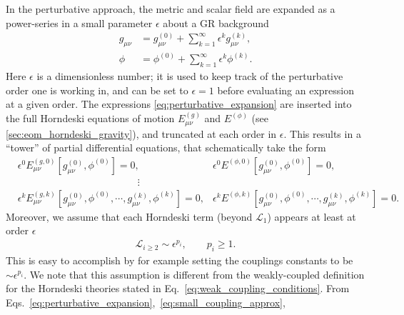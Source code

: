 \documentclass{ws-ijmpd}
\begin{document}
In the perturbative approach,
the metric and scalar field are expanded as a power-series
in a small parameter $\epsilon$ about a GR background
\begin{subequations}
   \label{eq:perturbative_expansion}
   \begin{align}
      g_{\mu\nu}
      &=
      g_{\mu\nu}^{(0)}
      +
      \sum_{k=1}^{\infty}\epsilon^k g^{(k)}_{\mu\nu}
      ,\\
      \phi
      &=
      \phi^{(0)}
      +
      \sum_{k=1}^{\infty}\epsilon^k\phi^{(k)}
      .
   \end{align}
\end{subequations}
Here $\epsilon$ is a dimensionless number; it is used to keep track
of the perturbative order one is working in, and can be set to $\epsilon=1$
before evaluating an expression at a given order.
The expressions \eqref{eq:perturbative_expansion} are inserted
into the full Horndeski equations of motion
$E^{(g)}_{\mu\nu}$ and $E^{(\phi)}$ (see \ref{sec:eom_horndeski_gravity}), 
and truncated at each order in $\epsilon$.
This results in a ``tower'' of partial differential equations, that
schematically take the form
\begin{align}
   \label{eq:perturbatve_tower}
   &\epsilon^0E^{(g,0)}_{\mu\nu}\left[g^{(0)}_{\mu\nu},\phi^{(0)}\right]
   =
   0
   ,
   &\epsilon^0 E^{(\phi,0)}\left[g^{(0)}_{\mu\nu},\phi^{(0)}\right]
   =
   0
   ,\nonumber\\
   &\qquad\qquad\qquad\qquad\qquad\qquad\vdots
   \\
   &\epsilon^kE^{(g,k)}_{\mu\nu}
   \left[
      g^{(0)}_{\mu\nu},\phi^{(0)},
      \cdots,
      g^{(k)}_{\mu\nu},\phi^{(k)}
   \right]
   =
   0
   ,
   &\epsilon^k E^{(\phi,k)}
   \left[
      g^{(0)}_{\mu\nu},\phi^{(0)},
      \cdots,
      g^{(k)}_{\mu\nu},\phi^{(k)}
   \right]
   =
   0
   \nonumber
   .
\end{align}
Moreover, we assume that each Horndeski term (beyond $\mathcal{L}_1$)
appears at least at order $\epsilon$
\begin{align}
   \label{eq:small_coupling_approx}
   \mathcal{L}_{i\geq2} \sim \epsilon^{p_i}, \qquad p_i\geq1
   .
\end{align}
This is easy to accomplish by
for example setting the couplings constants to be $\sim \epsilon^{p_i}$.
We note that this assumption is different from the
weakly-coupled definition for the Horndeski theories stated in 
Eq.~\eqref{eq:weak_coupling_conditions}. 
From Eqs.~\eqref{eq:perturbative_expansion},~\eqref{eq:small_coupling_approx},
\end{document}
